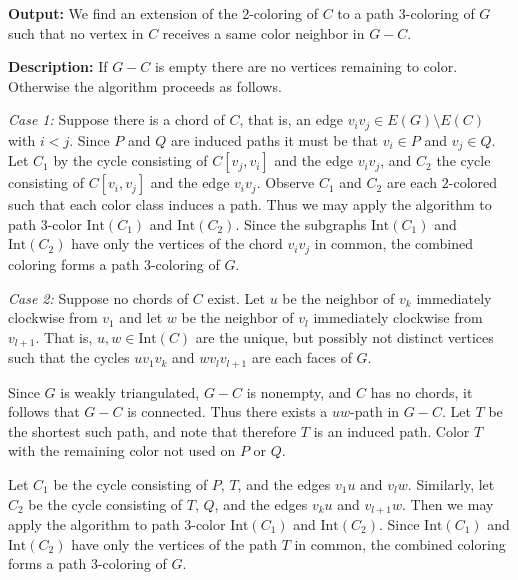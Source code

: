 \documentclass[letterpaper, 12pt]{article}
\theoremstyle{definition}
\theoremstyle{definition}
\theoremstyle{thm}
\theoremstyle{definition}
\begin{document}
\noindent\textbf{Output:} We find an extension of the $2$-coloring of $C$ to
a path $3$-coloring of $G$ such that no vertex in $C$ receives a same color
neighbor in $G-C$.

\noindent\textbf{Description:} If $G-C$ is empty there are no vertices remaining
to color. Otherwise the algorithm proceeds as follows.

\textit{Case 1:} Suppose there is a chord of $C$, that is, an edge
$v_iv_j\in E(G)\setminus E(C)$
with $i<j$. Since $P$ and $Q$ are induced paths it must be that $v_i\in P$ and
$v_j\in Q$. Let $C_1$ by the cycle consisting of $C[v_j,v_i]$ and the
edge $v_iv_j$, and $C_2$ the cycle consisting of $C[v_i,v_j]$ and the edge
$v_iv_j$. Observe $C_1$ and $C_2$ are each $2$-colored
such that each color class induces a path. Thus we may apply the algorithm to
path $3$-color $\text{Int}(C_1)$ and $\text{Int}(C_2)$. Since the subgraphs
$\text{Int}(C_1)$ and $\text{Int}(C_2)$ have only the vertices of the chord
$v_iv_j$ in common, the combined coloring forms a path $3$-coloring of $G$.

\textit{Case 2:} Suppose no chords of $C$ exist. Let $u$ be the neighbor of
$v_k$ immediately clockwise from $v_1$ and let $w$ be the neighbor of $v_l$
immediately clockwise from $v_{l+1}$. That is, $u,w\in\text{Int}(C)$ are the
unique, but possibly not distinct vertices such that the cycles $uv_1v_k$ and
$wv_lv_{l+1}$ are each faces of $G$.

Since $G$ is weakly triangulated, $G-C$ is nonempty, and $C$ has no chords, it
follows that $G-C$ is connected. Thus there exists a $uw$-path in
$G-C$. Let $T$ be the shortest such path, and note that therefore $T$ is
an induced path. Color $T$ with the remaining color not used on $P$ or $Q$.

Let $C_1$ be the cycle
consisting of $P$, $T$, and the edges $v_1u$ and $v_lw$. Similarly, let $C_2$ be
the cycle consisting of $T$, $Q$, and the edges $v_ku$ and $v_{l+1}w$. Then we
may apply the algorithm to path $3$-color $\text{Int}(C_1)$ and
$\text{Int}(C_2)$. Since $\text{Int}(C_1)$ and $\text{Int}(C_2)$ have only the
vertices of the path $T$ in common, the combined coloring forms a path
$3$-coloring of $G$.\\
\end{document}
